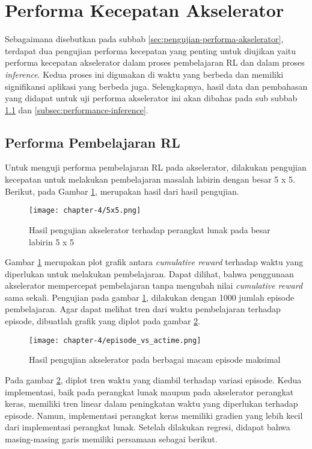 \section{Performa Kecepatan Akselerator}

Sebagaimana disebutkan pada subbab \ref{sec:pengujian-performa-akselerator}, terdapat dua pengujian performa kecepatan yang penting untuk diujikan yaitu performa kecepatan akselerator dalam proses pembelajaran \ac{RL} dan dalam proses \textit{inference}. Kedua proses ini digunakan di waktu yang berbeda dan memiliki signifikansi aplikasi yang berbeda juga. Selengkapnya, hasil data dan pembahasan yang didapat untuk uji performa akselerator ini akan dibahas pada sub subbab \ref{subsec:performance-learning} dan \ref{subsec:performance-inference}.

\subsection{Performa Pembelajaran \acl{RL}}
\label{subsec:performance-learning}

Untuk menguji performa pembelajaran \ac{RL} pada akselerator, dilakukan pengujian kecepatan untuk melakukan pembelajaran masalah labirin dengan besar 5 x 5. Berikut, pada Gambar \ref{fig:5x5}, merupakan hasil dari hasil pengujian.

\begin{figure}[h]
	\centering
	\texttt{[image: chapter-4/5x5.png]}
	\caption{Hasil pengujian akselerator terhadap perangkat lunak pada besar labirin 5 x 5}
	\label{fig:5x5}
\end{figure}

Gambar \ref{fig:5x5} merupakan plot grafik antara \textit{cumulative reward} terhadap waktu yang diperlukan untuk melakukan pembelajaran. Dapat dilihat, bahwa penggunaan akselerator mempercepat pembelajaran tanpa mengubah nilai \textit{cumulative reward} sama sekali. Pengujian pada gambar \ref{fig:5x5}, dilakukan dengan 1000 jumlah episode pembelajaran. Agar dapat melihat tren dari waktu pembelajaran terhadap episode, dibuatlah grafik yang diplot pada gambar \ref{fig:episode_vs_actime}.

\begin{figure}[htbp]
	\centering
	\texttt{[image: chapter-4/episode\_vs\_actime.png]}
	\caption{Hasil pengujian akselerator pada berbagai macam episode maksimal}
	\label{fig:episode_vs_actime}
\end{figure}

Pada gambar \ref{fig:episode_vs_actime}, diplot tren waktu yang diambil terhadap variasi episode. Kedua implementasi, baik pada perangkat lunak maupun pada akselerator perangkat keras, memiliki tren linear dalam peningkatan waktu yang diperlukan terhadap episode. Namun, implementasi perangkat keras memiliki gradien yang lebih kecil dari implementasi perangkat lunak. Setelah dilakukan regresi, didapat bahwa masing-masing garis memiliki persamaan sebagai berikut.

